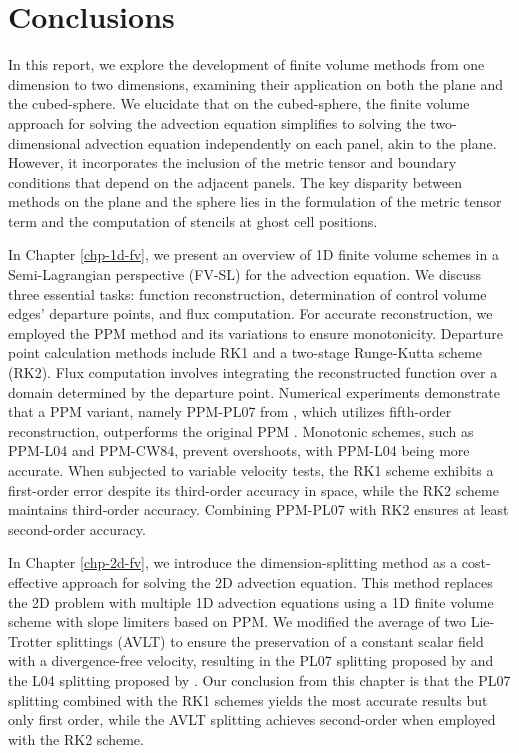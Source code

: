 \chapter{Conclusions}
\label{chp-conclusions}

In this report, we explore the development of finite volume methods from one dimension to two dimensions,
examining their application on both the plane and the cubed-sphere.
We elucidate that on the cubed-sphere, the finite volume approach for solving the advection equation simplifies to solving the two-dimensional
advection equation independently on each panel, akin to the plane.
However, it incorporates the inclusion of the metric tensor and boundary conditions that depend on the adjacent panels.
The key disparity between methods on the plane and the sphere lies in the formulation of the metric tensor term and the computation of stencils at ghost cell positions.


In Chapter \ref{chp-1d-fv}, we present an overview of 1D finite volume schemes in a Semi-Lagrangian perspective (FV-SL) for the advection equation.
We discuss three essential tasks: function reconstruction, determination of control volume edges' departure points, and flux computation.
For accurate reconstruction, we employed the PPM method and its variations to ensure monotonicity.
Departure point calculation methods include RK1 and a two-stage Runge-Kutta scheme (RK2).
Flux computation involves integrating the reconstructed function over a domain determined by the departure point.
Numerical experiments demonstrate that a PPM variant, namely PPM-PL07 from \citet{putman:2007}, which utilizes fifth-order reconstruction,
outperforms the original PPM \citep{colella:1984}. Monotonic schemes, such as PPM-L04 and PPM-CW84, prevent overshoots, with PPM-L04 being more accurate.
When subjected to variable velocity tests, the RK1 scheme exhibits a first-order error despite its third-order accuracy in space,
while the RK2 scheme maintains third-order accuracy. Combining PPM-PL07 with RK2 ensures at least second-order accuracy.

In Chapter \ref{chp-2d-fv}, we introduce the dimension-splitting method as a cost-effective approach for solving the 2D advection equation.
This method replaces the 2D problem with multiple 1D advection equations using a 1D finite volume scheme with slope limiters based on PPM.
We modified the average of two Lie-Trotter splittings (AVLT) to ensure the preservation of a constant scalar field with a divergence-free velocity,
resulting in the PL07 splitting proposed by \citet{putman:2007} and the L04 splitting proposed by \citet{lin:2004}.
Our conclusion from this chapter is that the PL07 splitting combined with the RK1 schemes yields the most accurate results but only first order,
while the AVLT splitting achieves second-order when employed with the RK2 scheme.

